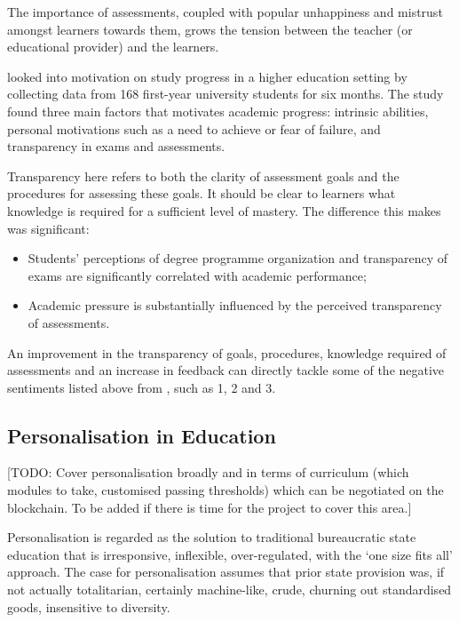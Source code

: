 The importance of assessments, coupled with popular unhappiness and mistrust amongst learners towards 
them, grows the tension between the teacher (or educational provider) and the learners.

\citet{suhre2013determinants} looked into motivation on study progress in a higher education setting by collecting data 
from 168 first-year university students for six months. The study found three main factors that motivates academic 
progress: intrinsic abilities, personal motivations such as a need to achieve or fear of failure, and transparency in 
exams and assessments.

Transparency here refers to both the clarity of assessment goals and the procedures for assessing these goals. 
It should be clear to learners what knowledge is required for a sufficient level of mastery. \citep{suhre2013determinants}
The difference this makes was significant:

\begin{itemize}
    \setlength\itemsep{0em}    
  \item Students' perceptions of degree programme organization and transparency of exams are 
  significantly correlated with academic performance;
  \item Academic pressure is substantially influenced by the perceived transparency of assessments.
\end{itemize}

An improvement in the transparency of goals, procedures, knowledge required of assessments and an increase 
in feedback can directly tackle some of the negative sentiments listed above from \citet{brown1999assessment}, 
such as 1, 2 and 3.

\subsection{Personalisation in Education}

[TODO: Cover personalisation broadly and in terms of curriculum (which modules to take, 
customised passing thresholds) which can be negotiated on the blockchain.
To be added if there is time for the project to cover this area.]

Personalisation is regarded as the solution to traditional bureaucratic state education that is irresponsive, 
inflexible, over-regulated, with the ‘one size fits all’ approach. The case for personalisation assumes that prior state 
provision was, if not actually totalitarian, certainly machine-like, crude, churning out standardised goods, 
insensitive to diversity. \citep{bragg2014review}

